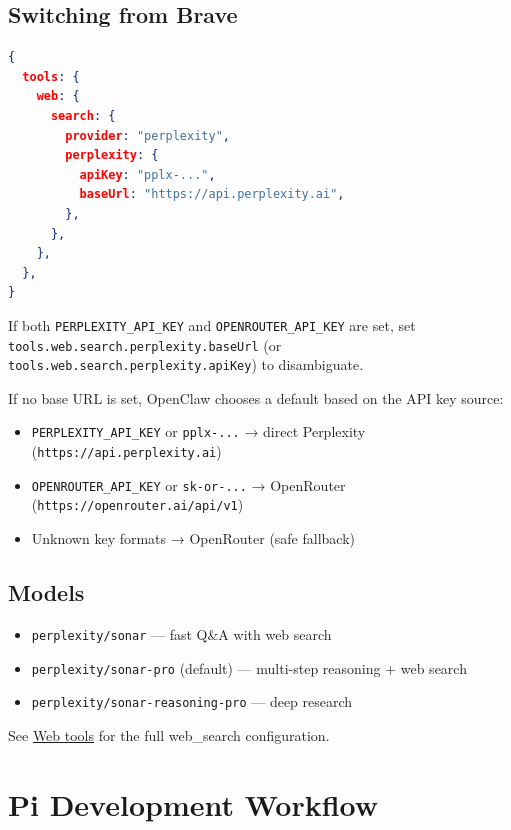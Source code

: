\subsection{Switching from Brave}


\begin{lstlisting}[language=json]
{
  tools: {
    web: {
      search: {
        provider: "perplexity",
        perplexity: {
          apiKey: "pplx-...",
          baseUrl: "https://api.perplexity.ai",
        },
      },
    },
  },
}
\end{lstlisting}


If both \texttt{PERPLEXITY\_API\_KEY} and \texttt{OPENROUTER\_API\_KEY} are set, set
\texttt{tools.web.search.perplexity.baseUrl} (or \texttt{tools.web.search.perplexity.apiKey})
to disambiguate.

If no base URL is set, OpenClaw chooses a default based on the API key source:

\begin{itemize}
  \item \texttt{PERPLEXITY\_API\_KEY} or \texttt{pplx-...} → direct Perplexity (\texttt{https://api.perplexity.ai})
  \item \texttt{OPENROUTER\_API\_KEY} or \texttt{sk-or-...} → OpenRouter (\texttt{https://openrouter.ai/api/v1})
  \item Unknown key formats → OpenRouter (safe fallback)
\end{itemize}


\subsection{Models}


\begin{itemize}
  \item \texttt{perplexity/sonar} — fast Q\&A with web search
  \item \texttt{perplexity/sonar-pro} (default) — multi-step reasoning + web search
  \item \texttt{perplexity/sonar-reasoning-pro} — deep research
\end{itemize}


See \href{/tools/web}{Web tools} for the full web\_search configuration.


\clearpage

\section{Pi Development Workflow}


